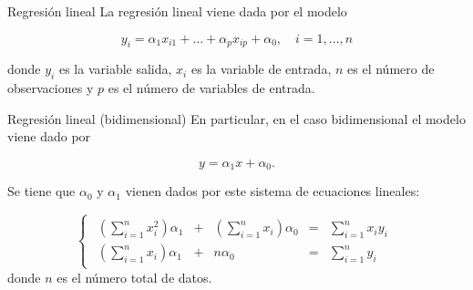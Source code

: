 \documentclass[hyperref={unicode}]{beamer}
\begin{document}
\begin{frame}{Regresión lineal}
	La regresión lineal viene dada por el modelo
	
	\begin{equation}
	y_i = \alpha_1 x_{i1} + \dots + \alpha_p x_{ip} + \alpha_0, \quad i = 1,...,n
	\end{equation}
	
	donde $y_i$ es la variable salida, $x_{i}$ es la variable de entrada, $n$ es el número de observaciones y $p$ es el número de variables de entrada.
	
	\begin{figure}
	\centering
	\qquad\qquad
	  
	\end{figure}
\end{frame}


\begin{frame}{Regresión lineal (bidimensional)}
	En particular, en el caso bidimensional el modelo viene dado por
	
	\begin{equation}
	y = \alpha_1 x + \alpha_0.
	\end{equation}
	
	Se tiene que $\alpha_0$ y $\alpha_1$ vienen dados por este sistema de ecuaciones lineales:
	
	\begin{equation}
	\begin{cases}
	\begin{array}{ccccc}
	\left(\displaystyle\sum_{i=1}^{n} x_i^2\right) \alpha_1 & + & \left(\displaystyle\sum_{i=1}^{n} x_i\right) \alpha_0 & = & \displaystyle \sum_{i=1}^{n} x_i y_i \\
	 \left(\displaystyle \sum_{i=1}^{n} x_i\right) \alpha_1 & + & n \alpha_0 & = & \displaystyle \sum_{i=1}^{n} y_i
	\end{array}
	\end{cases}
	\end{equation}
	donde $n$ es el número total de datos.
\end{frame}
\end{document}
